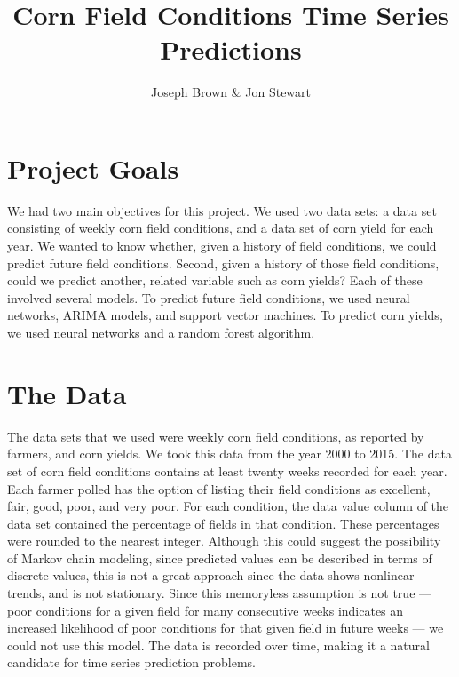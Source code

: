 \documentclass[a4paper]{apa6}
\title{Corn Field Conditions Time Series Predictions}
\author{Joseph Brown \& Jon Stewart}
\affiliation{Data Mining Final}
\begin{document}
\maketitle
\section*{Project Goals}
We had two main objectives for this project. We used two data sets: a data set consisting of weekly corn field conditions, and a data set of corn yield for each year. We wanted to know whether, given a history of field conditions, we could predict future field conditions. Second, given a history of those field conditions, could we predict another, related variable such as corn yields? Each of these involved several models. To predict future field conditions, we used neural networks, ARIMA models, and support vector machines. To predict corn yields, we used neural networks and a random forest algorithm.

\section*{The Data}
The data sets that we used were weekly corn field conditions, as reported by farmers, and corn yields. We took this data from the year 2000 to 2015. The data set of corn field conditions contains at least twenty weeks recorded for each year. Each farmer polled has the option of listing their field conditions as excellent, fair, good, poor, and very poor. For each condition, the data value column of the data set contained the percentage of fields in that condition.  These percentages were rounded to the nearest integer.  Although this could suggest the possibility of Markov chain modeling, since predicted values can be described in terms of discrete values, this is not a great approach since the data shows nonlinear trends, and is not stationary. Since this memoryless assumption is not true --- poor conditions for a given field for many consecutive weeks indicates an increased likelihood of poor conditions for that given field in future weeks --- we could not use this model. The data is recorded over time, making it a natural candidate for time series prediction problems.
\end{document}
